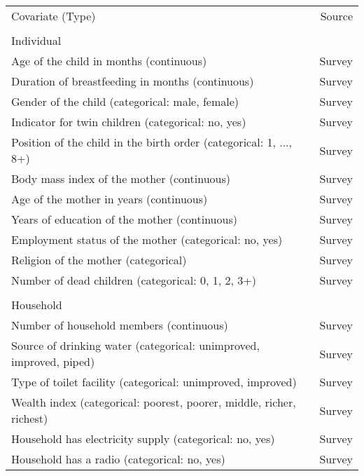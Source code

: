 \begin{table}[!p]

    \begin{tabularx}{\textwidth}{lr}
        Covariate (Type)                    	& Source\\ \arrayrulecolor{black!30}\midrule
                                                & \\
    Individual                                  & \\ \arrayrulecolor{black!10}\midrule
        Age of the child in months (continuous) & Survey\\
        Duration of breastfeeding in months (continuous) & Survey\\
        Gender of the child (categorical: male, female) & Survey\\
        Indicator for twin children (categorical: no, yes) & Survey\\
        Position of the child in the birth order (categorical: 1, ..., 8+) & Survey\\
        Body mass index of the mother (continuous) & Survey\\
        Age of the mother in years (continuous) & Survey\\
        Years of education of the mother (continuous) & Survey\\
        Employment status of the mother (categorical: no, yes) & Survey\\
        Religion of the mother (categorical) & Survey\\
        Number of dead children (categorical: 0, 1, 2, 3+) & Survey\\
                                                & \\
    Household                                   & \\ \arrayrulecolor{black!10}\midrule      
        Number of household members (continuous) & Survey\\
        Source of drinking water (categorical: unimproved, improved, piped) & Survey\\
        Type of toilet facility (categorical: unimproved, improved) & Survey\\
        Wealth index (categorical: poorest, poorer, middle, richer, richest) & Survey\\
        Household has electricity supply (categorical: no, yes) & Survey\\
        Household has a radio (categorical: no, yes) & Survey\\

\end{tabularx}
\end{table}
